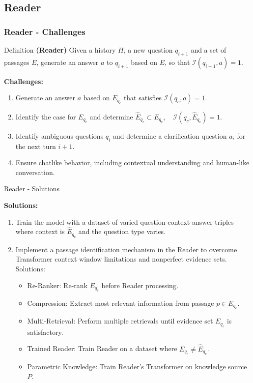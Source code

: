\documentclass{beamer}
\begin{document}
\subsection*{Reader}

\begin{frame}
  \frametitle{Reader - Challenges}

  \begin{block}{Definition}
    \textbf{(Reader)} Given a history $H$, a new question $q_{i+1}$ and a set of passages $E$, generate an answer $a$ to $q_{i+1}$ based on $E$, so that $\mathcal{I}(q_{i+1},a) = 1$.
  \end{block}

  \textbf{Challenges:}

  \begin{enumerate}
    \item Generate an answer $a$ based on $E_{q_c}$ that satisfies $\mathcal{I}(q_c, a) = 1$.
    \item Identify the case for $E_{q_c}$ and determine $\hat{E}_{q_c} \subset E_{q_c}, \quad \mathcal{I}(q_c, \hat{E}_{q_c}) = 1$.
    \item Identify ambiguous questions $q_{i}$ and determine a clarification question $a_{i}$ for the next turn $i+1$.
    \item Ensure chatlike behavior, including contextual understanding and human-like conversation.
  \end{enumerate}

\end{frame}

\begin{frame}{Reader - Solutions}

  \textbf{Solutions:}

  \begin{enumerate}
    \item Train the model with a dataset of varied question-context-answer triples where context is $\hat{E}_{q_c}$ and the question type varies.
    \item Implement a passage identification mechanism in the Reader to overcome Transformer context window limitations and nonperfect evidence sets. Solutions:
      \begin{itemize}
          \item Re-Ranker: Re-rank $E_{q_c}$ before Reader processing.
          \item Compression: Extract most relevant information from passage $p \in E_{q_c}$.
          \item Multi-Retrieval: Perform multiple retrievals until evidence set $E_{q_c}$ is satisfactory.
          \item Trained Reader: Train Reader on a dataset where $E_{q_c} \not= \hat{E}_{q_c}$.
          \item Parametric Knowledge: Train Reader's Transformer on knowledge source $P$.
      \end{itemize}
  \end{enumerate}
  
\end{frame}
\end{document}
